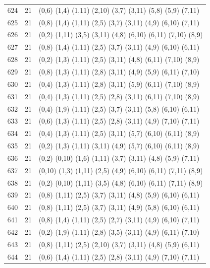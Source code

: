 \begin{appendix}
{\begin{longtable}{lll}
    624& 21 & (0,6)   (1,4)   (1,11)  (2,10)  (3,7)   (3,11)  (5,8)   (5,9)   (7,11)\\
    625& 21 & (0,8)   (1,4)   (1,11)  (2,5)   (3,7)   (3,11)  (4,9)   (6,10)  (7,11)\\
    626& 21 & (0,2)   (1,11)  (3,5)   (3,11)  (4,8)   (6,10)  (6,11)  (7,10)  (8,9)\\
    627& 21 & (0,8)   (1,4)   (1,11)  (2,5)   (3,7)   (3,11)  (4,9)   (6,10)  (6,11)\\
    628& 21 & (0,2)   (1,3)   (1,11)  (2,5)   (3,11)  (4,8)   (6,11)  (7,10)  (8,9)\\
    629& 21 & (0,8)   (1,3)   (1,11)  (2,8)   (3,11)  (4,9)   (5,9)   (6,11)  (7,10)\\
    630& 21 & (0,4)   (1,3)   (1,11)  (2,8)   (3,11)  (5,9)   (6,11)  (7,10)  (8,9)\\
    631& 21 & (0,4)   (1,3)   (1,11)  (2,5)   (2,8)   (3,11)  (6,11)  (7,10)  (8,9)\\
    632& 21 & (0,4)   (1,9)   (1,11)  (2,5)   (3,7)   (3,11)  (5,8)   (6,10)  (6,11)\\
    633& 21 & (0,6)   (1,3)   (1,11)  (2,5)   (2,8)   (3,11)  (4,9)   (7,10)  (7,11)\\
    634& 21 & (0,4)   (1,3)   (1,11)  (2,5)   (3,11)  (5,7)   (6,10)  (6,11)  (8,9)\\
    635& 21 & (0,2)   (1,3)   (1,11)  (3,11)  (4,9)   (5,7)   (6,10)  (6,11)  (8,9)\\
    636& 21 & (0,2)   (0,10)  (1,6)   (1,11)  (3,7)   (3,11)  (4,8)   (5,9)   (7,11)\\
    637& 21 & (0,10)  (1,3)   (1,11)  (2,5)   (4,9)   (6,10)  (6,11)  (7,11)  (8,9)\\
    638& 21 & (0,2)   (0,10)  (1,11)  (3,5)   (4,8)   (6,10)  (6,11)  (7,11)  (8,9)\\
    639& 21 & (0,8)   (1,11)  (2,5)   (3,7)   (3,11)  (4,8)   (5,9)   (6,10)  (6,11)\\
    640& 21 & (0,8)   (1,11)  (2,5)   (3,7)   (3,11)  (4,9)   (5,8)   (6,10)  (6,11)\\
    641& 21 & (0,8)   (1,4)   (1,11)  (2,5)   (2,7)   (3,11)  (4,9)   (6,10)  (7,11)\\
    642& 21 & (0,2)   (1,9)   (1,11)  (2,8)   (3,5)   (3,11)  (4,9)   (6,11)  (7,10)\\
    643& 21 & (0,8)   (1,11)  (2,5)   (2,10)  (3,7)   (3,11)  (4,8)   (5,9)   (6,11)\\
    644& 21 & (0,6)   (1,4)   (1,11)  (2,5)   (2,8)   (3,11)  (4,9)   (7,10)  (7,11)\\

\end{longtable}}
\end{appendix}
